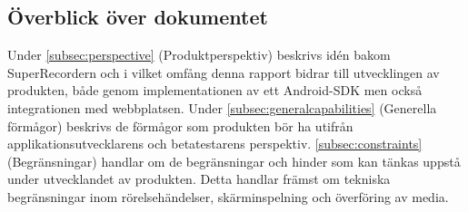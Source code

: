 \subsection{Överblick över dokumentet}
Under \ref{subsec:perspective} (Produktperspektiv) beskrivs idén bakom SuperRecordern och i vilket omfång denna rapport bidrar till utvecklingen av produkten, både genom implementationen av ett Android-SDK men också integrationen med webbplatsen. Under \ref{subsec:generalcapabilities} (Generella förmågor) beskrivs de förmågor som produkten bör ha utifrån applikationsutvecklarens och betatestarens perspektiv. \ref{subsec:constraints} (Begränsningar) handlar om de begränsningar och hinder som kan tänkas uppstå under utvecklandet av produkten. Detta handlar främst om tekniska begränsningar inom rörelsehändelser, skärminspelning och överföring av media.